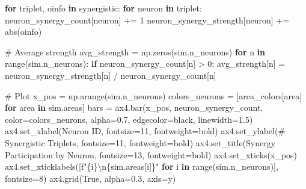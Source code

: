 \documentclass[
  11pt,
  letterpaper,
  oneside,
  openany]{book}
\newenvironment{Shaded}{\begin{snugshade}}{\end{snugshade}}
\newcommand{\BuiltInTok}[1]{\textcolor[rgb]{0.00,0.23,0.31}{#1}}
\newcommand{\CharTok}[1]{\textcolor[rgb]{0.13,0.47,0.30}{#1}}
\newcommand{\CommentTok}[1]{\textcolor[rgb]{0.37,0.37,0.37}{#1}}
\newcommand{\ControlFlowTok}[1]{\textcolor[rgb]{0.00,0.23,0.31}{\textbf{#1}}}
\newcommand{\DecValTok}[1]{\textcolor[rgb]{0.68,0.00,0.00}{#1}}
\newcommand{\FloatTok}[1]{\textcolor[rgb]{0.68,0.00,0.00}{#1}}
\newcommand{\KeywordTok}[1]{\textcolor[rgb]{0.00,0.23,0.31}{\textbf{#1}}}
\newcommand{\NormalTok}[1]{\textcolor[rgb]{0.00,0.23,0.31}{#1}}
\newcommand{\OperatorTok}[1]{\textcolor[rgb]{0.37,0.37,0.37}{#1}}
\newcommand{\SpecialCharTok}[1]{\textcolor[rgb]{0.37,0.37,0.37}{#1}}
\newcommand{\SpecialStringTok}[1]{\textcolor[rgb]{0.13,0.47,0.30}{#1}}
\newcommand{\StringTok}[1]{\textcolor[rgb]{0.13,0.47,0.30}{#1}}
\newcommand{\VariableTok}[1]{\textcolor[rgb]{0.07,0.07,0.07}{#1}}
\begin{document}
\begin{Shaded}
\begin{Highlighting}[]
\ControlFlowTok{for}\NormalTok{ triplet, oinfo }\KeywordTok{in}\NormalTok{ synergistic:}
    \ControlFlowTok{for}\NormalTok{ neuron }\KeywordTok{in}\NormalTok{ triplet:}
\NormalTok{        neuron\_synergy\_count[neuron] }\OperatorTok{+=} \DecValTok{1}
\NormalTok{        neuron\_synergy\_strength[neuron] }\OperatorTok{+=} \BuiltInTok{abs}\NormalTok{(oinfo)}

\CommentTok{\# Average strength}
\NormalTok{avg\_strength }\OperatorTok{=}\NormalTok{ np.zeros(sim.n\_neurons)}
\ControlFlowTok{for}\NormalTok{ n }\KeywordTok{in} \BuiltInTok{range}\NormalTok{(sim.n\_neurons):}
    \ControlFlowTok{if}\NormalTok{ neuron\_synergy\_count[n] }\OperatorTok{\textgreater{}} \DecValTok{0}\NormalTok{:}
\NormalTok{        avg\_strength[n] }\OperatorTok{=}\NormalTok{ neuron\_synergy\_strength[n] }\OperatorTok{/}\NormalTok{ neuron\_synergy\_count[n]}

\CommentTok{\# Plot}
\NormalTok{x\_pos }\OperatorTok{=}\NormalTok{ np.arange(sim.n\_neurons)}
\NormalTok{colors\_neurons }\OperatorTok{=}\NormalTok{ [area\_colors[area] }\ControlFlowTok{for}\NormalTok{ area }\KeywordTok{in}\NormalTok{ sim.areas]}
\NormalTok{bars }\OperatorTok{=}\NormalTok{ ax4.bar(x\_pos, neuron\_synergy\_count, color}\OperatorTok{=}\NormalTok{colors\_neurons, }
\NormalTok{              alpha}\OperatorTok{=}\FloatTok{0.7}\NormalTok{, edgecolor}\OperatorTok{=}\StringTok{\textquotesingle{}black\textquotesingle{}}\NormalTok{, linewidth}\OperatorTok{=}\FloatTok{1.5}\NormalTok{)}
\NormalTok{ax4.set\_xlabel(}\StringTok{\textquotesingle{}Neuron ID\textquotesingle{}}\NormalTok{, fontsize}\OperatorTok{=}\DecValTok{11}\NormalTok{, fontweight}\OperatorTok{=}\StringTok{\textquotesingle{}bold\textquotesingle{}}\NormalTok{)}
\NormalTok{ax4.set\_ylabel(}\StringTok{\textquotesingle{}\# Synergistic Triplets\textquotesingle{}}\NormalTok{, fontsize}\OperatorTok{=}\DecValTok{11}\NormalTok{, fontweight}\OperatorTok{=}\StringTok{\textquotesingle{}bold\textquotesingle{}}\NormalTok{)}
\NormalTok{ax4.set\_title(}\StringTok{\textquotesingle{}Synergy Participation by Neuron\textquotesingle{}}\NormalTok{, fontsize}\OperatorTok{=}\DecValTok{13}\NormalTok{, fontweight}\OperatorTok{=}\StringTok{\textquotesingle{}bold\textquotesingle{}}\NormalTok{)}
\NormalTok{ax4.set\_xticks(x\_pos)}
\NormalTok{ax4.set\_xticklabels([}\SpecialStringTok{f"}\SpecialCharTok{\{}\NormalTok{i}\SpecialCharTok{\}}\CharTok{\textbackslash{}n}\SpecialCharTok{\{}\NormalTok{sim}\SpecialCharTok{.}\NormalTok{areas[i]}\SpecialCharTok{\}}\SpecialStringTok{"} \ControlFlowTok{for}\NormalTok{ i }\KeywordTok{in} \BuiltInTok{range}\NormalTok{(sim.n\_neurons)], }
\NormalTok{                    fontsize}\OperatorTok{=}\DecValTok{8}\NormalTok{)}
\NormalTok{ax4.grid(}\VariableTok{True}\NormalTok{, alpha}\OperatorTok{=}\FloatTok{0.3}\NormalTok{, axis}\OperatorTok{=}\StringTok{\textquotesingle{}y\textquotesingle{}}\NormalTok{)}


\end{Highlighting}
\end{Shaded}
\end{document}
